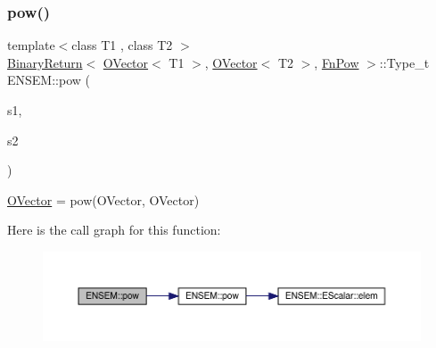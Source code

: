 \subsubsection{\texorpdfstring{pow()}{pow()}\hspace{0.1cm}{\footnotesize\ttfamily [1/3]}}
{\footnotesize\ttfamily template$<$class T1 , class T2 $>$ \\
\mbox{\hyperlink{structENSEM_1_1BinaryReturn}{Binary\+Return}}$<$ \mbox{\hyperlink{classENSEM_1_1OVector}{O\+Vector}}$<$ T1 $>$, \mbox{\hyperlink{classENSEM_1_1OVector}{O\+Vector}}$<$ T2 $>$, \mbox{\hyperlink{structENSEM_1_1FnPow}{Fn\+Pow}} $>$\+::Type\+\_\+t E\+N\+S\+E\+M\+::pow (\begin{DoxyParamCaption}\item[{const \mbox{\hyperlink{classENSEM_1_1OVector}{O\+Vector}}$<$ T1 $>$ \&}]{s1,  }\item[{const \mbox{\hyperlink{classENSEM_1_1OVector}{O\+Vector}}$<$ T2 $>$ \&}]{s2 }\end{DoxyParamCaption})\hspace{0.3cm}{\ttfamily [inline]}}



\mbox{\hyperlink{classENSEM_1_1OVector}{O\+Vector}} = pow(\+O\+Vector, O\+Vector) 

Here is the call graph for this function\+:\nopagebreak
\begin{figure}[H]
\begin{center}
\leavevmode
\includegraphics[width=350pt]{da/d59/group__obsvector_ga48ab93692ad432295c8498d12a368861_cgraph}
\end{center}
\end{figure}
\mbox{\label{group__obsvector_gacd9051c476ef11d6697002aa2b6ecd7c}} 
